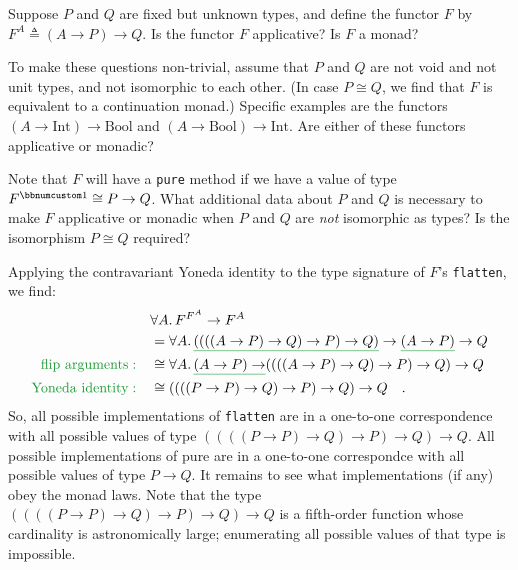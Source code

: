 Suppose $P$ and $Q$ are fixed but unknown types, and define the
functor $F$ by $F^{A}\triangleq(A\rightarrow P)\rightarrow Q$. Is
the functor $F$ applicative? Is $F$ a monad?

To make these questions non-trivial, assume that $P$ and $Q$ are
not void and not unit types, and not isomorphic to each other. (In
case $P\cong Q$, we find that $F$ is equivalent to a continuation
monad.) Specific examples are the functors $(A\rightarrow\text{Int})\rightarrow\text{Bool}$
and $(A\rightarrow\text{Bool})\rightarrow\text{Int}$. Are either
of these functors applicative or monadic?

Note that $F$ will have a \lstinline!pure! method if we have a value
of type $F^{\bbnum 1}\cong P\rightarrow Q$. What additional data
about $P$ and $Q$ is necessary to make $F$ applicative or monadic
when $P$ and $Q$ are \emph{not} isomorphic as types? Is the isomorphism
$P\cong Q$ required?

Applying the contravariant Yoneda identity to the type signature of
$F$\textsf{'}s \lstinline!flatten!, we find:
\begin{align*}
 & \forall A.\,F^{F^{A}}\rightarrow F^{A}\\
 & =\forall A.\,\gunderline{((((A\rightarrow P)\rightarrow Q)\rightarrow P)\rightarrow Q)}\rightarrow\gunderline{(A\rightarrow P)}\rightarrow Q\\
{\color{greenunder}\text{flip arguments}:}\quad & \cong\forall A.\,\gunderline{(A\rightarrow P)\rightarrow}((((A\rightarrow P)\rightarrow Q)\rightarrow P)\rightarrow Q)\rightarrow Q\\
{\color{greenunder}\text{Yoneda identity}:}\quad & \cong((((P\rightarrow P)\rightarrow Q)\rightarrow P)\rightarrow Q)\rightarrow Q\quad.
\end{align*}
So, all possible implementations of \lstinline!flatten! are in a
one-to-one correspondence with all possible values of type $((((P\rightarrow P)\rightarrow Q)\rightarrow P)\rightarrow Q)\rightarrow Q$.
All possible implementations of pure are in a one-to-one correspondce
with all possible values of type $P\rightarrow Q$. It remains to
see what implementations (if any) obey the monad laws. Note that the
type $((((P\rightarrow P)\rightarrow Q)\rightarrow P)\rightarrow Q)\rightarrow Q$
is a fifth-order function whose cardinality is astronomically large;
enumerating all possible values of that type is impossible.

